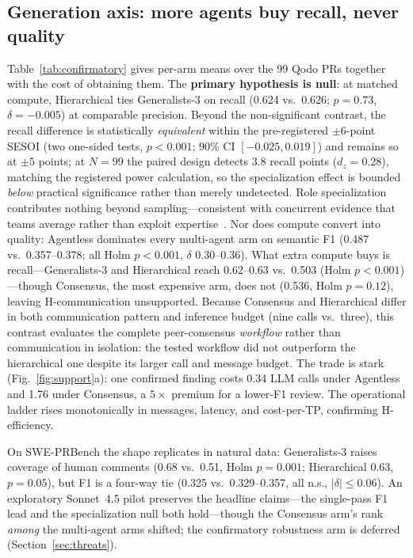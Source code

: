 \documentclass[conference]{IEEEtran}
\begin{document}
\subsection{Generation axis: more agents buy recall, never quality}
\label{sec:generation}
Table~\ref{tab:confirmatory} gives per-arm means over the 99 Qodo PRs together
with the cost of obtaining them. The \textbf{primary hypothesis is null}: at
matched compute, Hierarchical ties Generalists-3 on recall (0.624 vs.\ 0.626;
$p{=}0.73$, $\delta{=}{-}0.005$) at comparable precision. Beyond the
non-significant contrast, the recall difference is statistically
\emph{equivalent} within the pre-registered $\pm6$-point SESOI (two one-sided
tests, $p{<}0.001$; $90\%$ CI $[-0.025,0.019]$) and remains so at $\pm5$ points;
at $N{=}99$ the paired design detects $3.8$ recall points ($d_z{=}0.28$),
matching the registered power calculation, so the specialization effect is
bounded \emph{below} practical significance rather than merely undetected. Role
specialization
contributes nothing beyond sampling---consistent with concurrent evidence that
teams average rather than exploit expertise~\cite{pappu}. Nor does compute
convert into quality: Agentless dominates every multi-agent arm on semantic F1
(0.487 vs.\ 0.357--0.378; all Holm $p{<}0.001$, $\delta$ 0.30--0.36). What extra
compute buys is recall---Generalists-3 and Hierarchical reach 0.62--0.63 vs.\
0.503 (Holm $p{<}0.001$)---though Consensus, the most expensive arm, does not
(0.536, Holm $p{=}0.12$), leaving H-communication unsupported. Because Consensus
and Hierarchical differ in both communication pattern and inference budget
(nine calls vs.\ three), this contrast evaluates the complete peer-consensus
\emph{workflow} rather than communication in isolation: the tested workflow did
not outperform the hierarchical one despite its larger call and message budget.
The trade is stark (Fig.~\ref{fig:support}a): one confirmed finding costs 0.34
LLM calls under Agentless and 1.76 under Consensus, a $5\times$ premium for a
lower-F1 review. The operational ladder
rises monotonically in messages, latency, and cost-per-TP, confirming
H-efficiency.

On SWE-PRBench the shape replicates in natural data: Generalists-3 raises
coverage of human comments (0.68 vs.\ 0.51, Holm $p{=}0.001$; Hierarchical 0.63,
$p{=}0.05$), but F1 is a four-way tie (0.325 vs.\ 0.329--0.357, all n.s.,
$|\delta|{\le}0.06$). An exploratory Sonnet~4.5 pilot preserves the headline
claims---the single-pass F1 lead and the specialization null both hold---though
the Consensus arm's rank \emph{among} the multi-agent arms shifted; the
confirmatory robustness arm is deferred (Section~\ref{sec:threats}).
\end{document}
